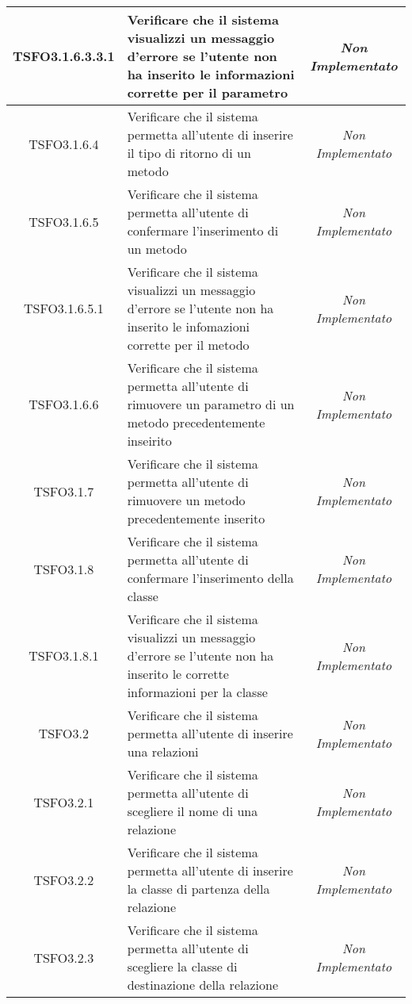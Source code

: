 \begin{longtable}{|c|>{}m{8cm}|c|}
\hypertarget{TSFO3.1.6.3.3.1}{TSFO3.1.6.3.3.1} & Verificare che il sistema visualizzi un messaggio d'errore se l'utente non ha inserito le informazioni corrette per il parametro & \textit{Non Implementato}\\ \hline
\hypertarget{TSFO3.1.6.4}{TSFO3.1.6.4} & Verificare che il sistema permetta all'utente di inserire il tipo di ritorno di un metodo & \textit{Non Implementato}\\ \hline
\hypertarget{TSFO3.1.6.5}{TSFO3.1.6.5} & Verificare che il sistema permetta all'utente di confermare l'inserimento di un metodo & \textit{Non Implementato}\\ \hline
\hypertarget{TSFO3.1.6.5.1}{TSFO3.1.6.5.1} & Verificare che il sistema visualizzi un messaggio d'errore se l'utente non ha inserito le infomazioni corrette per il metodo & \textit{Non Implementato}\\ \hline
\hypertarget{TSFO3.1.6.6}{TSFO3.1.6.6} & Verificare che il sistema permetta all'utente di rimuovere un parametro di un metodo precedentemente inseirito & \textit{Non Implementato}\\ \hline
\hypertarget{TSFO3.1.7}{TSFO3.1.7} & Verificare che il sistema permetta all'utente di rimuovere un metodo precedentemente inserito & \textit{Non Implementato}\\ \hline
\hypertarget{TSFO3.1.8}{TSFO3.1.8} & Verificare che il sistema permetta all'utente di confermare l'inserimento della classe & \textit{Non Implementato}\\ \hline
\hypertarget{TSFO3.1.8.1}{TSFO3.1.8.1} & Verificare che il sistema visualizzi un messaggio d'errore se l'utente non ha inserito le corrette informazioni per la classe & \textit{Non Implementato}\\ \hline
\hypertarget{TSFO3.2}{TSFO3.2} & Verificare che il sistema permetta all'utente di inserire una relazioni & \textit{Non Implementato}\\ \hline
\hypertarget{TSFO3.2.1}{TSFO3.2.1} & Verificare che il sistema permetta all'utente di scegliere il nome di una relazione & \textit{Non Implementato}\\ \hline
\hypertarget{TSFO3.2.2}{TSFO3.2.2} & Verificare che il sistema permetta all'utente di inserire la classe di partenza della relazione & \textit{Non Implementato}\\ \hline
\hypertarget{TSFO3.2.3}{TSFO3.2.3} & Verificare che il sistema permetta all'utente di scegliere la classe di destinazione della relazione & \textit{Non Implementato}\\ \hline

\end{longtable}

